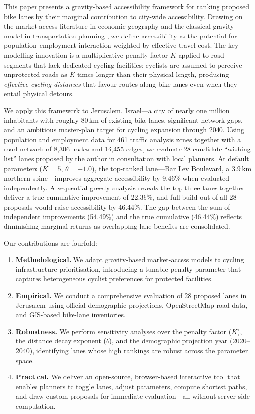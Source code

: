 \documentclass[12pt,a4paper]{article}
\begin{document}
This paper presents a gravity-based accessibility framework for ranking proposed bike lanes by their marginal contribution to city-wide accessibility. Drawing on the market-access literature in economic geography \citep{donaldson2016railroads,tsivanidis2024evaluating} and the classical gravity model in transportation planning \citep{hansen1959accessibility}, we define accessibility as the potential for population--employment interaction weighted by effective travel cost. The key modelling innovation is a multiplicative penalty factor $K$ applied to road segments that lack dedicated cycling facilities: cyclists are assumed to perceive unprotected roads as $K$ times longer than their physical length, producing \emph{effective cycling distances} that favour routes along bike lanes even when they entail physical detours.

We apply this framework to Jerusalem, Israel---a city of nearly one million inhabitants with roughly 80\,km of existing bike lanes, significant network gaps, and an ambitious master-plan target for cycling expansion through 2040. Using population and employment data for 461 traffic analysis zones together with a road network of 8{,}306 nodes and 16{,}455 edges, we evaluate 28 candidate ``wishing list'' lanes proposed by the author in consultation with local planners. At default parameters ($K=5$, $\theta=-1.0$), the top-ranked lane---Bar Lev Boulevard, a 3.9\,km northern spine---improves aggregate accessibility by 9.46\% when evaluated independently. A sequential greedy analysis reveals the top three lanes together deliver a true cumulative improvement of 22.39\%, and full build-out of all 28 proposals would raise accessibility by 46.44\%. The gap between the sum of independent improvements (54.49\%) and the true cumulative (46.44\%) reflects diminishing marginal returns as overlapping lane benefits are consolidated.

Our contributions are fourfold:

\begin{enumerate}[leftmargin=*]
    \item \textbf{Methodological.} We adapt gravity-based market-access models to cycling infrastructure prioritisation, introducing a tunable penalty parameter that captures heterogeneous cyclist preferences for protected facilities.
    \item \textbf{Empirical.} We conduct a comprehensive evaluation of 28 proposed lanes in Jerusalem using official demographic projections, OpenStreetMap road data, and GIS-based bike-lane inventories.
    \item \textbf{Robustness.} We perform sensitivity analyses over the penalty factor ($K$), the distance decay exponent ($\theta$), and the demographic projection year (2020--2040), identifying lanes whose high rankings are robust across the parameter space.
    \item \textbf{Practical.} We deliver an open-source, browser-based interactive tool that enables planners to toggle lanes, adjust parameters, compute shortest paths, and draw custom proposals for immediate evaluation---all without server-side computation.
\end{enumerate}
\end{document}
